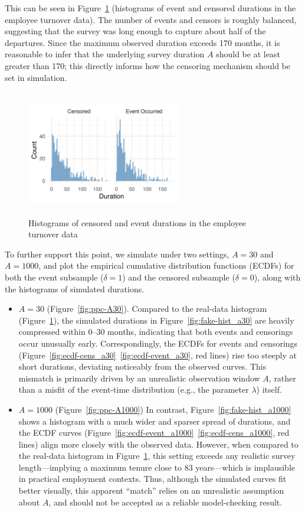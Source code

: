 This can be seen in Figure~\ref{fig:离职数据分开的直方图} (histograms of event and censored durations in the employee turnover data). The number of events and censors is roughly balanced, suggesting that the survey was long enough to capture about half of the departures. Since the maximum observed duration exceeds 170 months, it is reasonable to infer that the underlying survey duration $A$ should be at least greater than 170; this directly informs how the censoring mechanism should be set in simulation.
\begin{figure}[H]
    \centering
    \includegraphics[height=5.5cm, width=0.6\textwidth]{images/separate_hist.png}
    \caption{Histograms of censored and event durations in the employee turnover data}
    \label{fig:离职数据分开的直方图}
\end{figure}
To further support this point, we simulate under two settings, $A = 30$ and $A = 1000$, and plot the empirical cumulative distribution functions (ECDFs) for both the event subsample ($\delta = 1$) and the censored subsample ($\delta = 0$), along with the histograms of simulated durations.
\begin{itemize}
    \item $A = 30$ (Figure~\ref{fig:ppc-A30}). Compared to the real-data histogram (Figure~\ref{fig:离职数据分开的直方图}), the simulated durations in Figure~\ref{fig:fake-hist_a30} are heavily compressed within 0–30 months, indicating that both events and censorings occur unusually early. Correspondingly, the ECDFs for events and censorings (Figure~\ref{fig:ecdf-cens_a30}~\ref{fig:ecdf-event_a30}, red lines) rise too steeply at short durations, deviating noticeably from the observed curves. This mismatch is primarily driven by an unrealistic observation window $A$, rather than a misfit of the event-time distribution (e.g., the parameter $\lambda$) itself.
    \item $A = 1000$ (Figure~\ref{fig:ppc-A1000})
  In contrast, Figure~\ref{fig:fake-hist_a1000} shows a histogram with a much wider and sparser spread of durations, and the ECDF curves (Figure~\ref{fig:ecdf-event_a1000}~\ref{fig:ecdf-cens_a1000}, red lines) align more closely with the observed data. However, when compared to the real-data histogram in Figure~\ref{fig:离职数据分开的直方图}, this setting exceeds any realistic survey length—implying a maximum tenure close to 83 years—which is implausible in practical employment contexts. Thus, although the simulated curves fit better visually, this apparent “match” relies on an unrealistic assumption about $A$, and should not be accepted as a reliable model-checking result.
\end{itemize}
